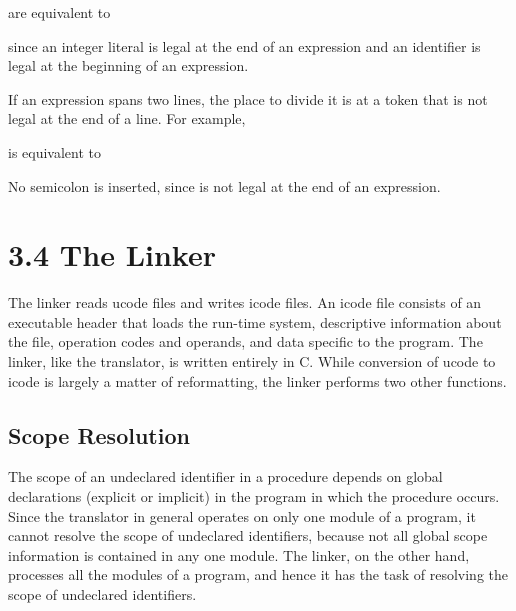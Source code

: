 \noindent are equivalent to


\noindent since an integer literal is legal at the end of an
expression and an identifier is legal at the beginning of an
expression.

If an expression spans two lines, the place to divide it is at a token
that is not legal at the end of a line. For example,


\noindent is equivalent to


No semicolon is inserted, since \texttt{{\textbar}{\textbar}} is not
legal at the end of an expression.

\section[3.4 The Linker]{3.4 The Linker}

The linker reads ucode files and writes icode files. An icode file
consists of an executable header that loads the run-time system,
descriptive information about the file, operation codes and operands,
and data specific to the program. The linker, like the translator, is
written entirely in C. While conversion of ucode to icode is largely a
matter of reformatting, the linker performs two other functions.

\subsection{Scope Resolution}

The scope of an undeclared identifier in a procedure depends on global
declarations (explicit or implicit) in the program in which the
procedure occurs. Since the translator in general operates on only one
module of a program, it cannot resolve the scope of undeclared
identifiers, because not all global scope information is contained in
any one module. The linker, on the other hand, processes all the
modules of a program, and hence it has the task of resolving the scope
of undeclared identifiers.

